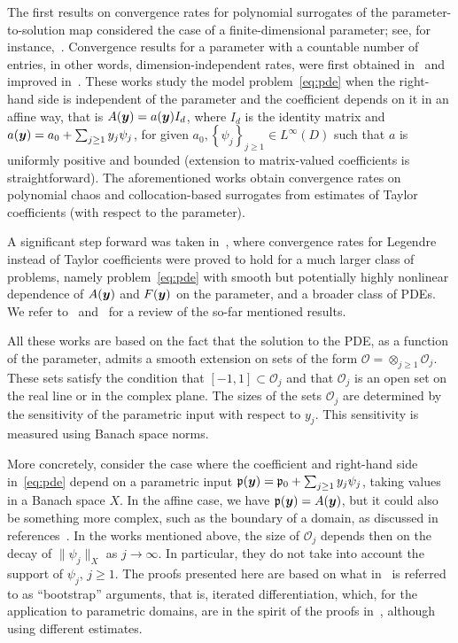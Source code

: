 The first results on convergence rates for polynomial surrogates of the parameter-to-solution map considered the case of a finite-dimensional parameter; see, for instance,~\cite{zhou2014,babuska2004,xiu2005}.
Convergence results for a parameter with a countable number of entries, in other words, dimension-independent rates, were first obtained in~\cite{todor2007} and improved in~\cite{cohen2010,cohen2011}.
These works study the model problem~\eqref{eq:pde} when the right-hand side is independent of the parameter and the coefficient depends on it in an affine way, that is $A({\bm{y}})=a({\bm{y}})I_d$, where $I_d$ is the identity matrix and $a({\bm{y}})=a_0 + \sum_{j\geq 1}y_j\psi_j$, for given $a_0, \left\{\psi_j\right\}_{j\geq 1}\in L^{\infty}(D)$ such that $a$ is uniformly positive and bounded (extension to matrix-valued coefficients is straightforward).
The aforementioned works obtain convergence rates on polynomial chaos and collocation-based surrogates from estimates of Taylor coefficients (with respect to the parameter).

A significant step forward was taken in~\cite{chkifa2015}, where convergence rates for Legendre instead of Taylor coefficients were proved to hold for a much larger class of problems, namely problem~\eqref{eq:pde} with smooth but potentially highly nonlinear dependence of $A({\bm{y}})$ and $F({\bm{y}})$ on the parameter, and a broader class of PDEs. We refer to~\cite{cohen2015} and~\cite[Ch. 2-4]{adcock2022} for a review of the so-far mentioned results.

All these works are based on the fact that the solution to the PDE, as a function of the parameter, admits a smooth extension on sets of the form $\mathcal{O}=\otimes_{j\geq 1}\mathcal{O}_j$.
These sets satisfy the condition that $[-1,1]\subset\mathcal{O}_j$ and that $\mathcal{O}_j$ is an open set on the real line or in the complex plane.
The sizes of the sets $\mathcal{O}_j$ are determined by the sensitivity of the parametric input with respect to $y_j$.
This sensitivity is measured using Banach space norms.

More concretely, consider the case where the coefficient and right-hand side in~\eqref{eq:pde} depend on a parametric input $\mathfrak{p}({\bm{y}}) = \mathfrak{p}_0 + \sum_{j\geq 1}y_j\psi_j$, taking values in a Banach space $X$.
In the affine case, we have $\mathfrak{p}({\bm{y}})=A({\bm{y}})$, but it could also be something more complex, such as the boundary of a domain, as discussed in references~\cite{castrillon-candas2016,harbrecht2016,hiptmair2018}.
In the works mentioned above, the size of $\mathcal{O}_j$ depends then on the decay of $\lVert\psi_j\rVert_X$ as $j\rightarrow\infty$.
In particular, they do not take into account the support of $\psi_j$, $j\geq 1$.
The proofs presented here are based on what in~\cite{dung2022} is referred to as ``bootstrap'' arguments, that is, iterated differentiation, which, for the application to parametric domains, are in the spirit of the proofs in~\cite{harbrecht2016}, although using different estimates.

